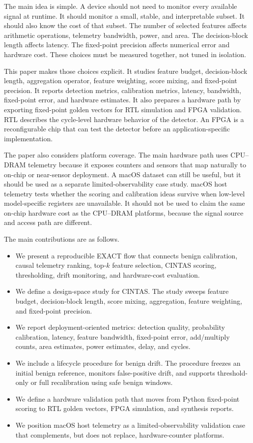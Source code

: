 The main idea is simple. A device should not need to monitor every available signal at runtime. It should monitor a small, stable, and interpretable subset. It should also know the cost of that subset. The number of selected features affects arithmetic operations, telemetry bandwidth, power, and area. The decision-block length affects latency. The fixed-point precision affects numerical error and hardware cost. These choices must be measured together, not tuned in isolation.

This paper makes those choices explicit. It studies feature budget, decision-block length, aggregation operator, feature weighting, score mixing, and fixed-point precision. It reports detection metrics, calibration metrics, latency, bandwidth, fixed-point error, and hardware estimates. It also prepares a hardware path by exporting fixed-point golden vectors for RTL simulation and FPGA validation. RTL describes the cycle-level hardware behavior of the detector. An FPGA is a reconfigurable chip that can test the detector before an application-specific implementation.

The paper also considers platform coverage. The main hardware path uses CPU--DRAM telemetry because it exposes counters and sensors that map naturally to on-chip or near-sensor deployment. A macOS dataset can still be useful, but it should be used as a separate limited-observability case study. macOS host telemetry tests whether the scoring and calibration ideas survive when low-level model-specific registers are unavailable. It should not be used to claim the same on-chip hardware cost as the CPU--DRAM platforms, because the signal source and access path are different.

The main contributions are as follows.

\begin{itemize}
    \item We present a reproducible EXACT flow that connects benign calibration, causal telemetry ranking, top-$k$ feature selection, CINTAS scoring, thresholding, drift monitoring, and hardware-cost evaluation.
    \item We define a design-space study for CINTAS. The study sweeps feature budget, decision-block length, score mixing, aggregation, feature weighting, and fixed-point precision.
    \item We report deployment-oriented metrics: detection quality, probability calibration, latency, feature bandwidth, fixed-point error, add/multiply counts, area estimates, power estimates, delay, and cycles.
    \item We include a lifecycle procedure for benign drift. The procedure freezes an initial benign reference, monitors false-positive drift, and supports threshold-only or full recalibration using safe benign windows.
    \item We define a hardware validation path that moves from Python fixed-point scoring to RTL golden vectors, FPGA simulation, and synthesis reports.
    \item We position macOS host telemetry as a limited-observability validation case that complements, but does not replace, hardware-counter platforms.
\end{itemize}

